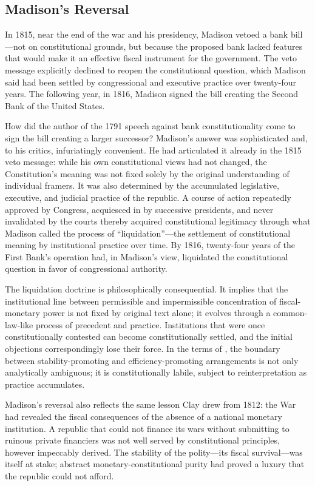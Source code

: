 \documentclass[12pt]{article}
\begin{document}
\subsection{Madison's Reversal}

In 1815, near the end of the war and his presidency, Madison vetoed a
bank bill---not on constitutional grounds, but because the proposed
bank lacked features that would make it an effective fiscal instrument
for the government.  The veto message explicitly declined to reopen the
constitutional question, which Madison said had been settled by
congressional and executive practice over twenty-four years.  The
following year, in 1816, Madison signed the bill creating the Second
Bank of the United States.

How did the author of the 1791 speech against bank constitutionality
come to sign the bill creating a larger successor?  Madison's answer
was sophisticated and, to his critics, infuriatingly convenient.
He had articulated it already in the 1815 veto message: while his own
constitutional views had not changed, the Constitution's meaning was
not fixed solely by the original understanding of individual framers.
It was also determined by the accumulated legislative, executive, and
judicial practice of the republic.  A course of action repeatedly
approved by Congress, acquiesced in by successive presidents, and
never invalidated by the courts thereby acquired constitutional
legitimacy through what Madison called the process of
``liquidation''---the settlement of constitutional meaning by
institutional practice over time.  By 1816, twenty-four years of the
First Bank's operation had, in Madison's view, liquidated the
constitutional question in favor of congressional authority.

The liquidation doctrine is philosophically consequential.  It implies
that the institutional line between permissible and impermissible
concentration of fiscal-monetary power is not fixed by original text
alone; it evolves through a common-law-like process of precedent and
practice.  Institutions that were once constitutionally contested can
become constitutionally settled, and the initial objections correspondingly
lose their force.  In the terms of \citet{Sargent2011}, the boundary
between stability-promoting and efficiency-promoting arrangements is not
only analytically ambiguous; it is constitutionally labile, subject to
reinterpretation as practice accumulates.

Madison's reversal also reflects the same lesson Clay drew from 1812:
the War had revealed the fiscal consequences of the absence of a national
monetary institution.  A republic that could not finance its wars
without submitting to ruinous private financiers was not well served by
constitutional principles, however impeccably derived.  The stability
of the polity---its fiscal survival---was itself at stake; abstract
monetary-constitutional purity had proved a luxury that the republic
could not afford.
\end{document}

